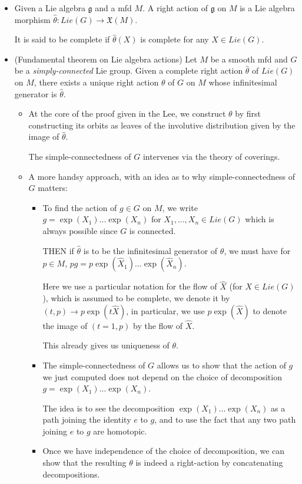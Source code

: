 \documentclass{report}
\theoremstyle{definition}
\begin{document}
\begin{itemize}
    \item Given a Lie algebra $\mathfrak{g}$ and a mfd $M$. A right action of $\mathfrak{g}$ on $M$ is a Lie algebra morphism $\hat{\theta}:Lie(G)\to\mathfrak{X}(M)$. 
    
    It is said to be complete if $\hat{\theta}(X)$ is complete for any $X\in Lie(G)$.
    \item (Fundamental theorem on Lie algebra actions) Let $M$ be a smooth mfd and $G$ be a \emph{simply-connected} Lie group. Given a complete right action $\hat{\theta}$ of $Lie(G)$ on $M$, there exists a unique right action $\theta$ of $G$ on $M$ whose infinitesimal generator is $\hat{\theta}$.

    \begin{itemize}
        \item At the core of the proof given in the Lee, we construct $\theta$ by first constructing its orbits as leaves of the involutive distribution given by the image of $\hat{\theta}$.

        The simple-connectedness of $G$ intervenes via the theory of coverings.
        \item A more handsy approach, with an idea as to why simple-connectedness of $G$ matters: 
        \begin{itemize} 
            \item To find the action of $g\in G$ on $M$, we write $g=\exp(X_1)...\exp(X_n)$ for $X_1,...,X_n\in Lie(G)$ which is always possible since $G$ is connected. 
            
            THEN if $\hat{\theta}$ is to be the infinitesimal generator of $\theta$, we must have for $p\in M$, $pg=p\exp(\hat{X}_1)...\exp(\hat{X}_n)$. 
            
            Here we use a particular notation for the flow of $\hat{X}$ (for $X\in Lie(G)$), which is assumed to be complete, we denote it by $(t,p)\to p\exp(t\hat{X})$, in particular, we use $p\exp(\hat{X})$ to denote the image of $(t=1,p)$ by the flow of $\hat{X}$.

            This already gives us uniqueness of $\theta$.
            \item The simple-connectedness of $G$ allows us to show that the action of $g$ we just computed does not depend on the choice of decomposition $g=\exp(X_1)...\exp(X_n)$.

            The idea is to see the decomposition $\exp(X_1)...\exp(X_n)$ as a path joining the identity $e$ to $g$, and to use the fact that any two path joining $e$ to $g$ are homotopic.
            \item Once we have independence of the choice of decomposition, we can show that the resulting $\theta$ is indeed a right-action by concatenating decompositions.
        \end{itemize}       
    \end{itemize}
\end{itemize}
\end{document}
